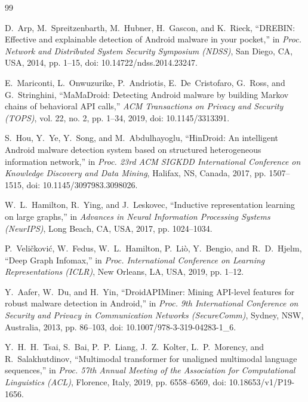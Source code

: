 \documentclass[12pt,a4paper,oneside]{report}
\begin{document}
\begin{thebibliography}{99}
{}

\setlength{\itemsep}{6pt}
\setlength{\parskip}{0pt}

D.~Arp, M.~Spreitzenbarth, M.~Hubner, H.~Gascon, and K.~Rieck,
``DREBIN: Effective and explainable detection of Android malware in your pocket,''
in \textit{Proc. Network and Distributed System Security Symposium (NDSS)},
San Diego, CA, USA, 2014, pp. 1--15,
doi: 10.14722/ndss.2014.23247.

E.~Mariconti, L.~Onwuzurike, P.~Andriotis, E.~De~Cristofaro, G.~Ross, and G.~Stringhini,
``MaMaDroid: Detecting Android malware by building Markov chains of behavioral API calls,''
\textit{ACM Transactions on Privacy and Security (TOPS)},
vol. 22, no. 2, pp. 1--34,
2019, doi: 10.1145/3313391.

S.~Hou, Y.~Ye, Y.~Song, and M.~Abdulhayoglu,
``HinDroid: An intelligent Android malware detection system based on structured heterogeneous information network,''
in \textit{Proc. 23rd ACM SIGKDD International Conference on Knowledge Discovery and Data Mining},
Halifax, NS, Canada, 2017, pp. 1507--1515,
doi: 10.1145/3097983.3098026.

W.~L.~Hamilton, R.~Ying, and J.~Leskovec,
``Inductive representation learning on large graphs,''
in \textit{Advances in Neural Information Processing Systems (NeurIPS)},
Long Beach, CA, USA, 2017, pp. 1024--1034.

P.~Veli\v{c}kovi\'{c}, W.~Fedus, W.~L.~Hamilton, P.~Li\`{o}, Y.~Bengio, and R.~D.~Hjelm,
``Deep Graph Infomax,''
in \textit{Proc. International Conference on Learning Representations (ICLR)},
New Orleans, LA, USA, 2019, pp. 1--12.

Y.~Aafer, W.~Du, and H.~Yin,
``DroidAPIMiner: Mining API-level features for robust malware detection in Android,''
in \textit{Proc. 9th International Conference on Security and Privacy in Communication Networks (SecureComm)},
Sydney, NSW, Australia, 2013, pp. 86--103,
doi: 10.1007/978-3-319-04283-1\_6.

Y.~H.~H.~Tsai, S.~Bai, P.~P.~Liang, J.~Z.~Kolter, L.~P.~Morency, and R.~Salakhutdinov,
``Multimodal transformer for unaligned multimodal language sequences,''
in \textit{Proc. 57th Annual Meeting of the Association for Computational Linguistics (ACL)},
Florence, Italy, 2019, pp. 6558--6569,
doi: 10.18653/v1/P19-1656.


\end{thebibliography}
\end{document}
